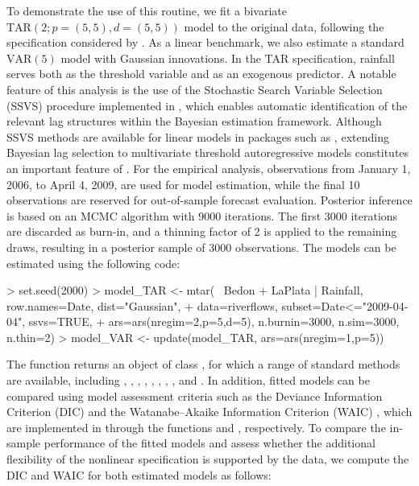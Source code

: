 To demonstrate the use of this routine, we fit a bivariate $\text{TAR}(2; p=(5,5), d=(5,5))$ model to the original data, following the specification considered by \cite{CN17}. As a linear benchmark, we also estimate a standard $\text{VAR}(5)$ model with Gaussian innovations. In the TAR specification, rainfall serves both as the threshold variable and as an exogenous predictor. A notable feature of this analysis is the use of the Stochastic Search Variable Selection (SSVS) procedure implemented in , which enables automatic identification of the relevant lag structures within the Bayesian estimation framework. Although SSVS methods are available for linear models in packages such as , extending Bayesian lag selection to multivariate threshold autoregressive models constitutes an important feature of . For the empirical analysis, observations from January 1, 2006, to April 4, 2009, are used for model estimation, while the final 10 observations are reserved for out-of-sample forecast evaluation. Posterior inference is based on an MCMC algorithm with 9000 iterations. The first 3000 iterations are discarded as burn-in, and a thinning factor of 2 is applied to the remaining draws, resulting in a posterior sample of 3000 observations. The models can be estimated using the following code:

\begin{example}
> set.seed(2000)
> model_TAR <- mtar(~ Bedon + LaPlata | Rainfall, row.names=Date, dist="Gaussian", 
+                   data=riverflows, subset={Date<="2009-04-04"}, ssvs=TRUE,
+                   ars=ars(nregim=2,p=5,d=5), n.burnin=3000, n.sim=3000, n.thin=2)
> model_VAR <- update(model_TAR, ars=ars(nregim=1,p=5))
\end{example}

The  function returns an object of class , for which a range of standard methods are available, including , , , , , , , , and . In addition, fitted models can be compared using model assessment criteria such as the Deviance Information Criterion (DIC) \citep{spiegelhalter02,spiegelhalter14} and the Watanabe--Akaike Information Criterion (WAIC) \citep{w10}, which are implemented in  through the functions  and , respectively. To compare the in-sample performance of the fitted models and assess whether the additional flexibility of the nonlinear specification is supported by the data, we compute the DIC and WAIC for both estimated models as follows:

